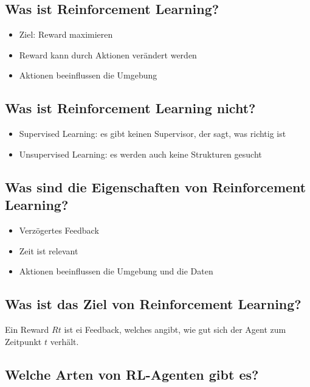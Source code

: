 \documentclass[a4paper]{article}
\begin{document}
		\subsection{Was ist Reinforcement Learning?}
		
		\begin{itemize}
			\item Ziel: Reward maximieren
			\item Reward kann durch Aktionen verändert werden
			\item Aktionen beeinflussen die Umgebung
		\end{itemize}
	
		\subsection{Was ist Reinforcement Learning nicht?}
		
		\begin{itemize}
			\item Supervised Learning: es gibt keinen Supervisor, der sagt, was richtig ist
			\item Unsupervised Learning: es werden auch keine Strukturen gesucht
		\end{itemize}
	
		\subsection{Was sind die Eigenschaften von Reinforcement Learning?}
		
		\begin{itemize}
			\item Verzögertes Feedback
			\item Zeit ist relevant
			\item Aktionen beeinflussen die Umgebung und die Daten
		\end{itemize}
	
		\subsection{Was ist das Ziel von Reinforcement Learning?}
		
		Ein Reward $Rt$ ist ei Feedback, welches angibt, wie gut sich der Agent zum Zeitpunkt $t$ verhält.
		
		\subsection{Welche Arten von RL-Agenten gibt es?}
		
\end{document}
